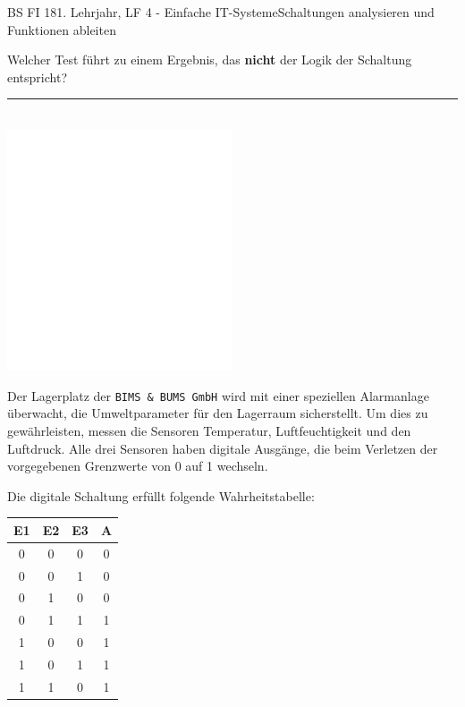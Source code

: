 \documentclass[oneside,openany,headings=optiontotoc,11pt,numbers=noenddot]{scrreprt}
\begin{document}
\begin{worksheet}{BS FI 18}{1. Lehrjahr, LF 4 - Einfache IT-Systeme}{Schaltungen analysieren und Funktionen ableiten}
\begin{framed}
			\par\noindent
			Welcher Test führt zu einem Ergebnis, das \textbf{nicht} der Logik der Schaltung entspricht?\\
			\par\noindent
			\rule{\textwidth}{0.1pt}\\
			\includegraphics[width=0.5\textwidth]{../../empty.jpg}
		\end{framed}
		\begin{framed}
			\noindent
			Der Lagerplatz der \texttt{BIMS \& BUMS GmbH} wird mit einer speziellen Alarmanlage überwacht, die Umweltparameter für den Lagerraum sicherstellt. Um dies zu gewährleisten, messen die Sensoren Temperatur, Luftfeuchtigkeit und den Luftdruck. Alle drei Sensoren haben digitale Ausgänge, die beim Verletzen der vorgegebenen Grenzwerte von 0 auf 1 wechseln.\\
			\par\noindent
			Die digitale Schaltung erfüllt folgende Wahrheitstabelle:\\
			\par\noindent
			\begin{minipage}{0.25\textwidth}
				\renewcommand{\arraystretch}{1.5}
				\begin{tabular}{|c|c|c|c|}
					\hline
					\textbf{E1} & \textbf{E2} & \textbf{E3} & \textbf{A}\\
					\hline
					\hline
					0 & 0 & 0 & 0\\
					\hline
					0 & 0 & 1 & 0\\
					\hline
					0 & 1 & 0 & 0\\
					\hline
					0 & 1 & 1 & 1\\
					\hline
					1 & 0 & 0 & 1\\
					\hline
					1 & 0 & 1 & 1\\
					\hline
					1 & 1 & 0 & 1\\

\end{tabular}
\end{minipage}
\end{framed}
\end{worksheet}
\end{document}
